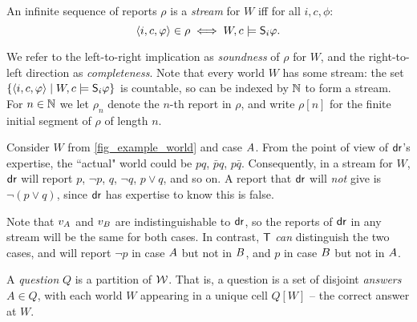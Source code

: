 \begin{definition}
    \label{def_stream}
    An infinite sequence of reports $\rho$ is a \emph{stream} for $W$ iff for
    all $i, c, \phi$:
    \[
        \langle {i, c, \varphi} \rangle \in \rho \iff W, c \models \mathsf{S}_i\varphi.
    \]
\end{definition}

We refer to the left-to-right implication as \emph{soundness} of $\rho$ for
$W$, and the right-to-left direction as \emph{completeness}. Note that every
world $W$ has some stream: the set $\{\langle {i, c, \varphi} \rangle \mid W, c \models
\mathsf{S}_i\varphi\}$ is countable, so can be indexed by $\mathbb{N}$ to form a stream. For $n
\in \mathbb{N}$ we let $\rho_n$ denote the $n$-th report in $\rho$, and write $\rho[n]$
for the finite initial segment of $\rho$ of length $n$.

\begin{example}
    \label{ex_stream}
    Consider $W$ from \cref{fig_example_world} and case $A{}$. From the
    point of view of $\mathsf{dr}{}$'s expertise, the ``actual" world could be $pq$,
    $\bar{p}q$, $p\bar{q}$. Consequently, in a stream for $W$, $\mathsf{dr}{}$ will
    report $p$, $\neg p$, $q$, $\neg q$, $p \lor q$, and so on. A report that
    $\mathsf{dr}{}$ will \emph{not} give is $\neg (p \lor q)$, since $\mathsf{dr}{}$ has
    expertise to know this is false.

    Note that $v_{A{}}$ and $v_{B{}}$ are indistinguishable to
    $\mathsf{dr}{}$, so the reports of $\mathsf{dr}{}$ in any stream will be the same for both
    cases. In contrast, $\mathsf{T}{}$ \emph{can} distinguish the two cases, and
    will report $\neg p$ in case $A{}$ but not in $B{}$, and
    $p$ in case $B{}$ but not in $A{}$.
\end{example}

A \emph{question} $Q$ is a partition of $\mathcal{W}$. That is, a question is a set
of disjoint \emph{answers} $A \in Q$, with each world $W$ appearing in a unique
cell $Q[W]$ -- the correct answer at $W$.

